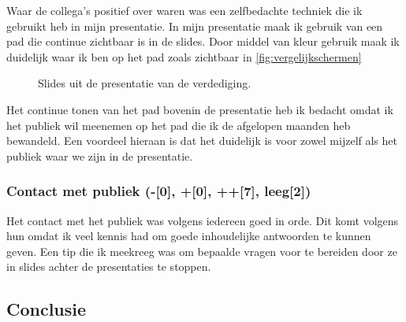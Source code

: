 \documentclass[a4paper, 11pt, oneside]{report}
\begin{document}
Waar de collega's positief over waren was een zelfbedachte techniek die ik gebruikt heb in mijn presentatie.
In mijn presentatie maak ik gebruik van een pad die continue zichtbaar is in de slides.
Door middel van kleur gebruik maak ik duidelijk waar ik ben op het pad zoals zichtbaar in \autoref{fig:vergelijkschermen}

\begin{figure}[H]%
	\centering
	\qquad
	\caption{Slides uit de presentatie van de verdediging.}%
	\label{fig:vergelijkschermen}%
\end{figure}

Het continue tonen van het pad bovenin de presentatie heb ik bedacht omdat ik het publiek wil meenemen op het pad die ik de afgelopen maanden heb bewandeld.
Een voordeel hieraan is dat het duidelijk is voor zowel mijzelf als het publiek waar we zijn in de presentatie.

\subsubsection{Contact met publiek (-[0], +[0], ++[7], leeg[2])}
Het contact met het publiek was volgens iedereen goed in orde.
Dit komt volgens hun omdat ik veel kennis had om goede inhoudelijke antwoorden te kunnen geven.  
Een tip die ik meekreeg was om bepaalde vragen voor te bereiden door ze in slides achter de presentaties te stoppen.

\subsection{Conclusie}
\end{document}

